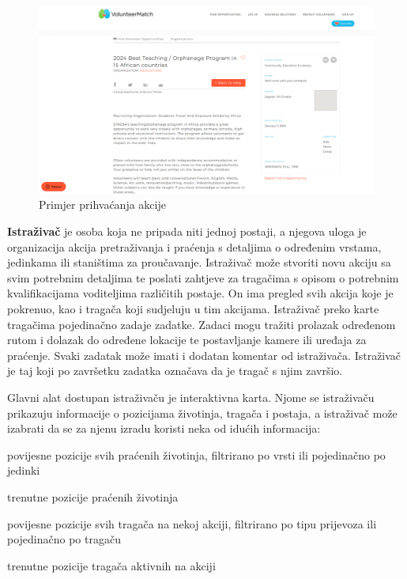 		\begin{figure}[H]
			\includegraphics[scale=0.35]{slike/pr_prihvacanje_akcije.PNG} %
			\centering
			\caption{Primjer prihvaćanja akcije}
			\label{fig:promjene}
		\end{figure}
		
		\textbf{Istraživač} je osoba koja ne pripada niti jednoj postaji, a njegova uloga je organizacija akcija pretraživanja i praćenja s detaljima o određenim vrstama, jedinkama ili staništima za proučavanje. Istraživač može stvoriti novu akciju sa svim potrebnim detaljima te poslati zahtjeve za tragačima  s opisom o potrebnim kvalifikacijama voditeljima različitih postaje. On ima pregled svih akcija koje je pokrenuo, kao i tragača koji sudjeluju u tim akcijama. Istraživač preko karte tragačima pojedinačno zadaje zadatke. Zadaci mogu tražiti prolazak određenom rutom i dolazak do određene lokacije te postavljanje kamere ili uređaja za praćenje. Svaki zadatak može imati i dodatan komentar od istraživača. Istraživač je taj koji po završetku zadatka označava da je tragač s njim završio.
		
		Glavni alat dostupan istraživaču je interaktivna karta. Njome se istraživaču prikazuju informacije o pozicijama životinja, tragača i postaja, a istraživač može izabrati da se za njenu izradu koristi neka od idućih informacija: 
		
		\begin{packed_item}
			\item povijesne pozicije svih praćenih životinja, filtrirano po vrsti ili pojedinačno po jedinki 
			\item trenutne pozicije praćenih životinja
			\item povijesne pozicije svih tragača na nekoj akciji, filtrirano po tipu prijevoza ili pojedinačno po tragaču 
			\item trenutne pozicije tragača aktivnih na akciji
		\end{packed_item}
		
